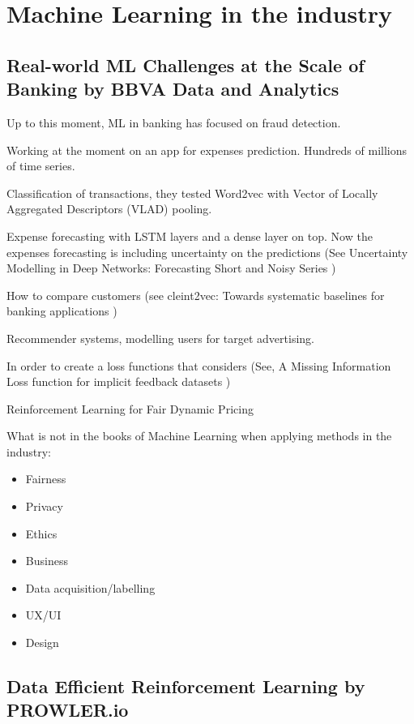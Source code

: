 \chapter{Machine Learning in the industry}

\section{Real-world ML Challenges at the Scale of Banking by BBVA Data and
Analytics}

Up to this moment, ML in banking has focused on fraud detection.

Working at the moment on an app for expenses prediction. Hundreds of millions
of time series.

Classification of transactions, they tested Word2vec with Vector of Locally
Aggregated Descriptors (VLAD) pooling.

Expense forecasting with LSTM layers and a dense layer on top. Now the expenses
forecasting is including uncertainty on the predictions (See Uncertainty
  Modelling in Deep Networks: Forecasting Short and Noisy Series
\cite{brando2018uncertainty})

How to compare customers (see cleint2vec: Towards systematic baselines for
banking applications \cite{baldassini2018client2vec})

Recommender systems, modelling users for target advertising.

In order to create a loss functions that considers (See, A Missing Information
Loss function for implicit feedback datasets \cite{arevalo2018missing} )

Reinforcement Learning for Fair Dynamic Pricing \cite{maestre2018reinforcement}

What is not in the books of Machine Learning when applying methods in the
industry:

\begin{itemize}
  \item Fairness
  \item Privacy
  \item Ethics
  \item Business
  \item Data acquisition/labelling
  \item UX/UI
  \item Design
\end{itemize}

\section{Data Efficient Reinforcement Learning by PROWLER.io}

